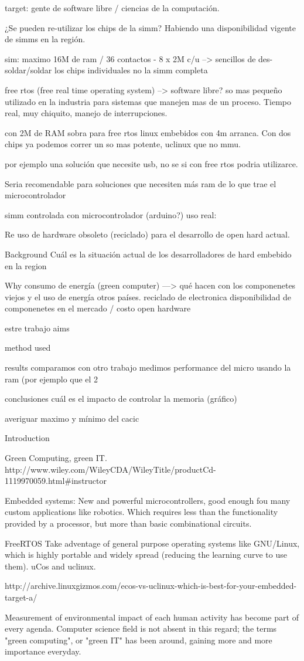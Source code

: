 target: gente de software libre / ciencias de la computación. 

¿Se pueden re-utilizar los chips de la simm? Habiendo una disponibilidad vigente 
de simms en la región.

sim: maximo 16M de ram / 36 contactos  - 8 x 2M c/u 
\---> sencillos de des-soldar/soldar los chips individuales no la simm completa

free rtos (free real time operating system) --> software libre? 
so mas pequeño utilizado en la industria para sistemas que manejen 
mas de un proceso. Tiempo real, muy chiquito, manejo de interrupciones. 

con 2M de RAM sobra para free rtos
linux embebidos con 4m arranca. Con dos chips ya podemos correr un so 
mas potente, uclinux que no mmu. 

por ejemplo una solución que necesite usb, no se si con free rtos podria 
utilizarce. 

Seria recomendable para soluciones que necesiten más ram de lo que trae
el microcontrolador

simm controlada con microcontrolador  (arduino?)
uso real:

Re uso de hardware obsoleto (reciclado) para el desarrollo de open hard actual. 

Background 
Cuál es la situación actual de los desarrolladores de hard embebido en la region

Why
	consumo de energía (green computer)
		\----> 	qué hacen con los componenetes viejos y el uso de 
			energía otros países.
	reciclado de electronica 
	disponibilidad de componenetes en el mercado / costo 
	open hardware 

estre trabajo aims


method used 

results 
	comparamos con otro trabajo 
	medimos performance del micro usando la ram 
	(por ejemplo que el 2%

conclusiones
	cuál es el impacto de controlar la memoria (gráfico)

averiguar maximo y mínimo del cacic



Introduction


Green Computing, green IT. 
http://www.wiley.com/WileyCDA/WileyTitle/productCd-1119970059.html#instructor

Embedded systems: 
New and powerful microcontrollers, good enough fou many custom applications 
like robotics. Which requires less than the functionality provided by a processor, but more than basic combinational circuits. 

FreeRTOS 
Take adventage of general purpose operating systems like GNU/Linux, which is highly portable and widely spread (reducing the learning curve to use them). uCos and uclinux.  

http://archive.linuxgizmos.com/ecos-vs-uclinux-which-is-best-for-your-embedded-target-a/


Measurement of environmental impact of each human activity has become part of 
every agenda. Computer science field is not absent in this regard; the terms 
"green computing", or "green IT" has been around, gaining more and more 
importance everyday. 

 
